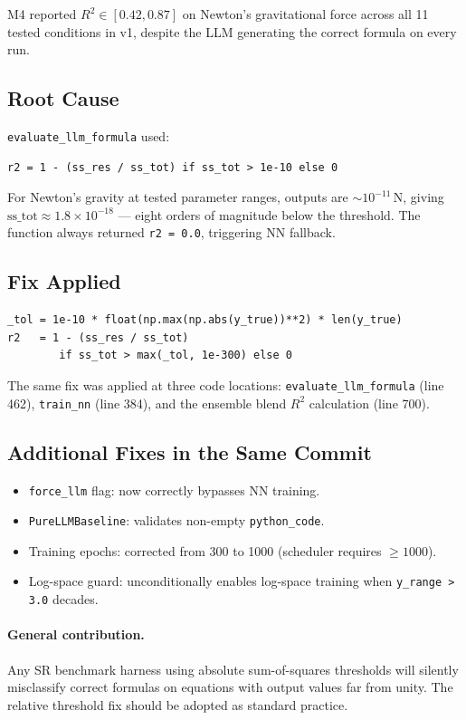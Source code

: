 \documentclass[twoside,11pt]{article}
\newcommand{\Rsq}{R^{2}}
\begin{document}
M4 reported $\Rsq \in [0.42, 0.87]$ on Newton's gravitational force across
all 11 tested conditions in v1, despite the LLM generating the correct formula
on every run.

\subsection{Root Cause}

\texttt{evaluate\_llm\_formula} used:
\begin{verbatim}
r2 = 1 - (ss_res / ss_tot) if ss_tot > 1e-10 else 0
\end{verbatim}
For Newton's gravity at tested parameter ranges, outputs are $\sim 10^{-11}$\,N,
giving $\mathrm{ss\_tot} \approx 1.8 \times 10^{-18}$ — eight orders of
magnitude below the threshold.  The function always returned
\texttt{r2 = 0.0}, triggering NN fallback.

\subsection{Fix Applied}

\begin{verbatim}
_tol = 1e-10 * float(np.max(np.abs(y_true))**2) * len(y_true)
r2   = 1 - (ss_res / ss_tot)
        if ss_tot > max(_tol, 1e-300) else 0
\end{verbatim}

The same fix was applied at three code locations:
\texttt{evaluate\_llm\_formula} (line 462),
\texttt{train\_nn} (line 384), and
the ensemble blend $\Rsq$ calculation (line 700).

\subsection{Additional Fixes in the Same Commit}

\begin{itemize}
  \item \texttt{force\_llm} flag: now correctly bypasses NN training.
  \item \texttt{PureLLMBaseline}: validates non-empty \texttt{python\_code}.
  \item Training epochs: corrected from 300 to 1000 (scheduler requires $\geq 1000$).
  \item Log-space guard: unconditionally enables log-space training when
    \texttt{y\_range > 3.0} decades.
\end{itemize}

\paragraph{General contribution.}
Any SR benchmark harness using absolute sum-of-squares thresholds will
silently misclassify correct formulas on equations with output values far
from unity.  The relative threshold fix should be adopted as standard practice.
\end{document}
